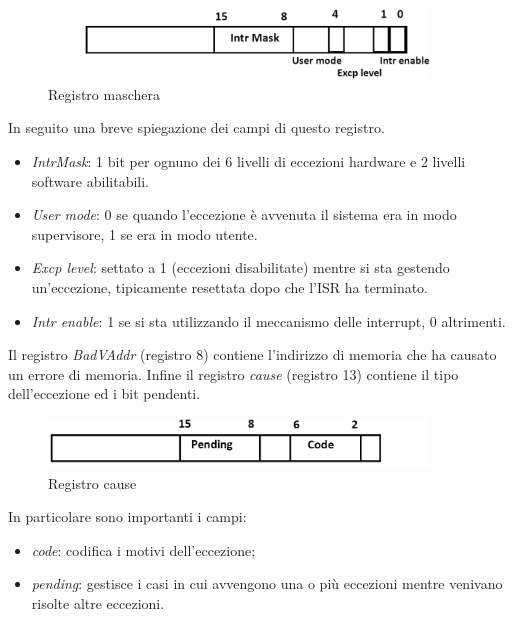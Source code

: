 \documentclass[class=book, crop=false, oneside]{standalone}
\begin{document}
\begin{figure}[H]
	\centering
	\includegraphics[width=0.9\textwidth,keepaspectratio]{registro-maschera}
	\caption{Registro maschera}
\end{figure}
In seguito una breve spiegazione dei campi di questo registro.
\begin{itemize}
	\item \emph{IntrMask}:  1 bit per ognuno dei 6 livelli di eccezioni hardware e 2 livelli software abilitabili.
	\item \emph{User mode}: 0 se quando l'eccezione è avvenuta il sistema era in modo supervisore, 1 se era in modo utente.
	\item \emph{Excp level}: settato a 1 (eccezioni disabilitate) mentre si sta gestendo un'eccezione, tipicamente resettata dopo che l'ISR ha terminato.
	\item \emph{Intr enable}: 1 se si sta utilizzando il meccanismo delle interrupt, 0 altrimenti.
\end{itemize}
Il registro \emph{BadVAddr} (registro 8) contiene l'indirizzo di memoria che ha causato un errore di memoria. Infine il registro \emph{cause} (registro 13) contiene il tipo dell'eccezione ed i bit pendenti.

\begin{figure}[H]
	\centering
	\includegraphics[width=0.9\textwidth,keepaspectratio]{registro-cause}
	\caption{Registro cause}
\end{figure}

In particolare sono importanti i campi:
\begin{itemize}
	\item \emph{code}: codifica i motivi dell'eccezione;
	\item \emph{pending}: gestisce i casi in cui avvengono una o più eccezioni mentre venivano risolte altre eccezioni.
\end{itemize}
\end{document}
